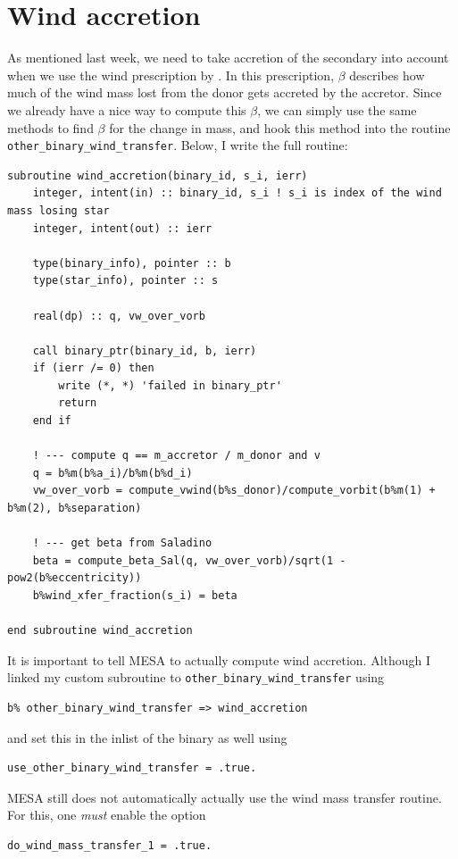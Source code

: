\documentclass[a4paper,10pt]{article}
\begin{document}
\section{Wind accretion}
As mentioned last week, we need to take accretion of the secondary into account when we use the wind prescription by \citet{saladino2019}. In this prescription, \(\beta\) describes how much of the wind mass lost from the donor gets accreted by the accretor. Since we already have a nice way to compute this \(\beta \), we can simply use the same methods to find \(\beta \) for the change in mass, and hook this method into the routine \lstinline[style=output, breaklines=true]|other_binary_wind_transfer|. Below, I write the full routine:
\begin{verbatim}
subroutine wind_accretion(binary_id, s_i, ierr)
    integer, intent(in) :: binary_id, s_i ! s_i is index of the wind mass losing star
    integer, intent(out) :: ierr

    type(binary_info), pointer :: b
    type(star_info), pointer :: s

    real(dp) :: q, vw_over_vorb

    call binary_ptr(binary_id, b, ierr)
    if (ierr /= 0) then
        write (*, *) 'failed in binary_ptr'
        return
    end if

    ! --- compute q == m_accretor / m_donor and v
    q = b%m(b%a_i)/b%m(b%d_i)
    vw_over_vorb = compute_vwind(b%s_donor)/compute_vorbit(b%m(1) + b%m(2), b%separation)

    ! --- get beta from Saladino
    beta = compute_beta_Sal(q, vw_over_vorb)/sqrt(1 - pow2(b%eccentricity))
    b%wind_xfer_fraction(s_i) = beta

end subroutine wind_accretion
\end{verbatim}

It is important to tell MESA to actually compute wind accretion.
Although I linked my custom subroutine to \lstinline[style=output, breaklines=true]|other_binary_wind_transfer| using
\begin{verbatim}
b% other_binary_wind_transfer => wind_accretion 
\end{verbatim}
and set this in the inlist of the binary as well using
\begin{verbatim}
use_other_binary_wind_transfer = .true.
\end{verbatim}
MESA still does not automatically actually use the wind mass transfer routine. For this, one \emph{must} enable the option
\begin{verbatim}
do_wind_mass_transfer_1 = .true.
\end{verbatim}
\end{document}
